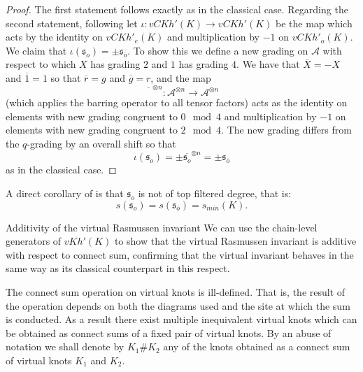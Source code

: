 \documentclass[10pt,oneside]{amsart}
\theoremstyle{definition}
\numberwithin{equation}{section}
\begin{document}
\begin{proof}
	The first statement follows exactly as in the classical case. Regarding the second statement, following \cite{Rasmussen2010} let \( \iota : {vCKh} ' ( K ) \rightarrow {vCKh} ' ( K ) \) be the map which acts by the identity on \( {vCKh}'_e(K) \) and multiplication by \( -1 \) on \( {vCKh}'_o(K) \). We claim that \( \iota ( {\mathfrak{s}}_o ) = \pm {\mathfrak{s}}_{\overline{o}} \). To show this we define a new grading on \( \mathcal{A} \) with respect to which \( X \) has grading \( 2 \) and \( 1 \) has grading \( 4 \). We have that \( \overline{X} = - X \) and \( \overline{1} = 1 \) so that \( \overline{r} = g \) and \( \overline{g} = r \), and the map
	\begin{equation*}
	\overline{\phantom{X}}^{\otimes n} : \mathcal{A}^{\otimes n} \rightarrow \mathcal{A}^{\otimes n}
	\end{equation*}
	(which applies the barring operator to all tensor factors) acts as the identity on elements with new grading congruent to \( 0 \mod{4} \) and multiplication by \( - 1 \) on elements with new grading congruent to \( 2 \mod{4} \). The new grading differs from the \( q \)-grading by an overall shift so that
	\begin{equation*}
	\iota ( {\mathfrak{s}}_{o} ) = \pm \overline{{\mathfrak{s}}_{o}}^{\otimes n} = \pm {\mathfrak{s}}_{\overline{o}}
	\end{equation*}
	as in the classical case.
\end{proof}

A direct corollary of  is that \( {\mathfrak{s}}_{o} \) is not of top filtered degree, that is:
\begin{equation}
\label{smin}
s ( {\mathfrak{s}}_{o} ) = s ( {\mathfrak{s}}_{\overline{o}} ) = s_{min} ( K ).
\end{equation}

{		{\normalfont\bfseries\large}}{Additivity of the virtual Rasmussen invariant}
\label{Sec:additive}
We can use the chain-level generators of \( {vKh} ' ( K ) \) to show that the virtual Rasmussen invariant is additive with respect to connect sum, confirming that the virtual invariant behaves in the same way as its classical counterpart in this respect.

The connect sum operation on virtual knots is ill-defined. That is, the result of the operation depends on both the diagrams used and the site at which the sum is conducted. As a result there exist multiple inequivalent virtual knots which can be obtained as connect sums of a fixed pair of virtual knots. By an abuse of notation we shall denote by \( K_1 \# K_2 \) any of the knots obtained as a connect sum of virtual knots \( K_1 \) and \( K_2 \).
\end{document}
